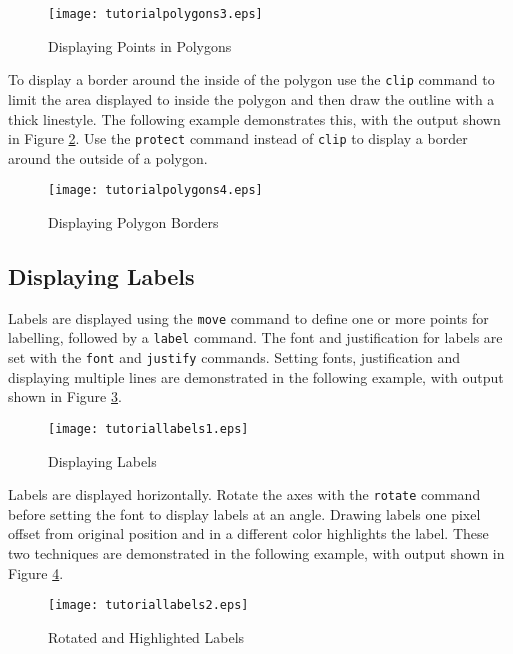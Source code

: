 

\begin{figure}[htb]
\texttt{[image: tutorialpolygons3.eps]}
\caption{Displaying Points in Polygons}
\label{tutorialpolygons3}
\end{figure}

To display a border around the inside of the polygon
use the \texttt{clip}
command to limit the area displayed to inside the polygon
and then draw the outline with a thick linestyle.
The following example demonstrates this, with the output shown
in Figure \ref{tutorialpolygons4}.
Use the \texttt{protect} command instead of \texttt{clip}
to display a border around the outside of a polygon.



\begin{figure}[htb]
\texttt{[image: tutorialpolygons4.eps]}
\caption{Displaying Polygon Borders}
\label{tutorialpolygons4}
\end{figure}

\subsection{Displaying Labels}

Labels are displayed using the \texttt{move}
command to define one or more points for labelling, followed by a
\texttt{label} command.  The font and justification for labels
are set with the \texttt{font} and \texttt{justify} commands.
Setting fonts, justification and displaying multiple lines
are demonstrated in the following example, with output
shown in Figure \ref{tutoriallabels1}.



\begin{figure}[htb]
\texttt{[image: tutoriallabels1.eps]}
\caption{Displaying Labels}
\label{tutoriallabels1}
\end{figure}

Labels are displayed horizontally.  Rotate the axes with the \texttt{rotate}
command before setting the font to display labels at an angle.  Drawing labels
one pixel offset from original position and in a different color highlights the
label.  These two techniques are demonstrated in the following example,
with output shown in Figure \ref{tutoriallabels2}.



\begin{figure}[htb]
\texttt{[image: tutoriallabels2.eps]}
\caption{Rotated and Highlighted Labels}
\label{tutoriallabels2}
\end{figure}

